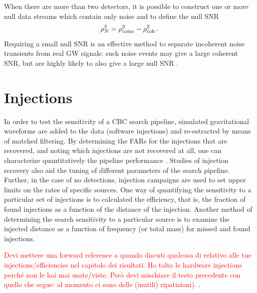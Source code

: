 \documentclass[binding=0.6cm, LaM]{sapthesis}
\newcommand{\fpg}[1]{\textcolor{red}{#1} }
\begin{document}
        When there are more than two detectors, 
	it is possible to construct one or more null data streams 
	which contain only noise and to define the null SNR
		\begin{equation}
			\rho^2_N = \rho^2_{\rm coinc} - \rho^2_{\rm coh}\,. 
		\end{equation}
	Requiring a small null SNR is an effective method to separate 
	incoherent noise transients from real GW signals: 
	such noise events may give a large coherent SNR,
	but are highly likely to also give a large null SNR \cite{45}.       

\section{Injections}

	In order to test the sensitivity of a CBC search pipeline, 
	simulated gravitational waveforms are added to the data (software injections) and re-estracted by means of matched filtering.
	By determining the FARs for the injections that are recovered, 	
	and noting which injections are not recovered at all,
	one can characterize quantitatively the pipeline performance \cite{47, 48}.
	Studies of injection recovery also aid the tuning of different parameters 
	of the search pipeline.  Further, in the case of no detections, injection campaigns are used to set upper limits on the rates of specific sources.
 	One way of quantifying the sensitivity to a particular set of injections is to calculated the efficiency, that is, the fraction of found injections as a function of the distance of the injection. 
	Another method of determining the search sensitivity to a particular source 
	is to examine the injected distance as a function of frequency 
	(or total mass) for missed and found injections.

        \fpg{Devi mettere una forward reference a quando discuti qualcosa di relativo alle tue injections/efficiencies nel capitolo dei risultati.  Ho tolto le hardware injections perch\'e non le hai mai usate/viste.  Per\`o devi mischiare il testo precedente con quello che segue: al momento ci sono delle (inutili) ripatizioni).}.
\end{document}
